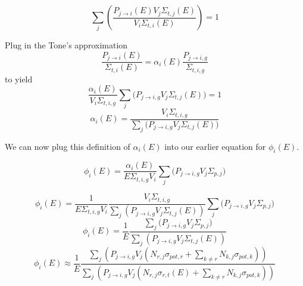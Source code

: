 \documentclass{beamer}
\begin{document}
    \begin{frame}
      \begin{equation*}\sum\limits_{j}\left(\frac{P_{j\rightarrow i}(E)V_{j}\Sigma_{t,j}(E)}{V_{i}\Sigma_{t,i}(E)}\right)=1\end{equation*}

    Plug in the Tone's approximation
    \begin{equation*}\frac{P_{j\rightarrow i}(E)}{\Sigma_{t,i}(E)}=\alpha_{i}(E)\frac{P_{j\rightarrow i,g}}{\Sigma_{t,i,g}}\end{equation*}
      to yield
      \begin{equation*}\frac{\alpha_i(E)}{V_i\Sigma_{t,i,g}}\sum\limits_{j}\Big(P_{j\rightarrow i,g}V_{j}\Sigma_{t,j}(E)\Big)=1\end{equation*}
        \begin{equation*}\alpha_i(E)=\frac{V_i\Sigma_{t,i,g}}{\sum\limits_{j}\Big(P_{j\rightarrow i,g}V_{j}\Sigma_{t,j}(E)\Big)}\end{equation*}

          We can now plug this definition of $\alpha_i(E)$ into our earlier equation for $\phi_i(E)$.
    \end{frame}





    \begin{frame}
      \begin{equation*}\phi_{i}(E)=\frac{\alpha_i(E)}{E\Sigma_{t,i,g}V_i}\sum\limits_j\Big(P_{j\rightarrow i,g}V_{j}\Sigma_{p,j}\Big)\end{equation*}

        \begin{equation*}\phi_{i}(E)=\frac{1}{E\Sigma_{t,i,g}V_i}\frac{V_i\Sigma_{t,i,g}}{\sum\limits_{j}\left(P_{j\rightarrow i,g}V_{j}\Sigma_{t,j}(E)\right)}\sum\limits_j\Big(P_{j\rightarrow i,g}V_{j}\Sigma_{p,j}\Big)\end{equation*}
          \begin{equation*}\phi_{i}(E)=\frac{1}{E}\frac{\sum\limits_j\Big(P_{j\rightarrow i,g}V_{j}\Sigma_{p,j}\Big)}{\sum\limits_{j}\left(P_{j\rightarrow i,g}V_{j}\Sigma_{t,j}(E)\right)}\end{equation*}
            \begin{equation*}\phi_{i}(E)\approx\frac{1}{E}\frac{\sum\limits_j\left(P_{j\rightarrow i,g}V_{j}\left(N_{r,j}\sigma_{pot,r}+\sum\limits_{k\neq r}N_{k,j}\sigma_{pot,k}\right)\right)}{\sum\limits_{j}\left(P_{j\rightarrow i,g}V_{j}\left(N_{r,j}\sigma_{r,t}(E)+\sum\limits_{k\neq r}N_{k,j}\sigma_{pot,k}\right)\right)}\end{equation*}


    \end{frame}
\end{document}
